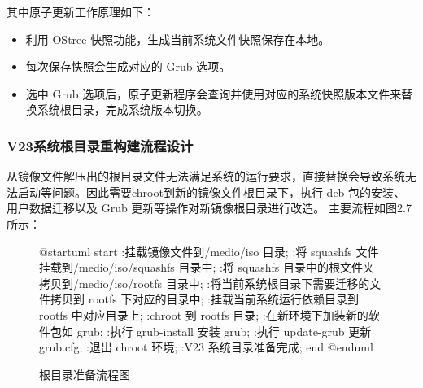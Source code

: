 \documentclass{utart}
\begin{document}
其中原子更新工作原理如下：
\begin{itemize}
    \item 利用 OStree 快照功能，生成当前系统文件快照保存在本地。
    \item 每次保存快照会生成对应的 Grub 选项。
    \item 选中 Grub 选项后，原子更新程序会查询并使用对应的系统快照版本文件来替换系统根目录，完成系统版本切换。
\end{itemize}

\subsubsection{V23系统根目录重构建流程设计}
从镜像文件解压出的根目录文件无法满足系统的运行要求，直接替换会导致系统无法启动等问题。因此需要chroot到新的镜像文件根目录下，执行 deb 包的安装、用户数据迁移以及 Grub 更新等操作对新镜像根目录进行改造。
主要流程如图2.7 所示：

\begin{figure}[H]
    \centering
    \begin{plantuml}
        @startuml
        start
        :挂载镜像文件到/medio/iso 目录;
        :将 squashfs 文件挂载到/medio/iso/squashfs 目录中;
        :将 squashfs 目录中的根文件夹拷贝到/medio/iso/rootfs 目录中;
        :将当前系统根目录下需要迁移的文件拷贝到 rootfs 下对应的目录中;
        :挂载当前系统运行依赖目录到 rootfs 中对应目录上;
        :chroot 到 rootfs 目录;
        :在新环境下加装新的软件包如 grub;
        :执行 grub-install 安装 grub;
        :执行 update-grub 更新 grub.cfg;
        :退出 chroot 环境;
        :V23 系统目录准备完成;
        end
        @enduml
    \end{plantuml}
    \caption{根目录准备流程图}
    \label{fig:rootmake}
\end{figure}
\end{document}
